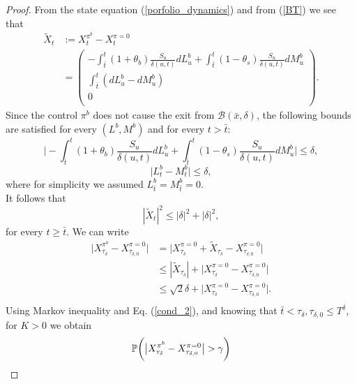 \begin{proof}
From the state equation (\ref{porfolio_dynamics}) and from (\ref{BT}) we see that
\begin{align}
\tilde{X}_t &:= X^{\pi^b}_t - X^{\pi = 0}_t \\
             &=
\left( \begin{array}{c}
  - \int_{\bar t}^t (1+\theta_b)\frac{S_u}{\delta(u,t)} dL^b_u + \int_{\bar t}^t (1-\theta_s) \frac{S_u}{\delta(u,t)} dM^b_u \\ 
  \int_{\bar t}^t (dL^b_u - dM^b_u) \\
  0 \\
  \end{array} \right).
\end{align}
Since the control $\pi^b$ does not cause the exit from $ \mathcal{B}(\bar x, \delta) $, the following bounds are satisfied for every $(L^b,M^b)$ and for every $t>\bar t$:
\begin{equation}
\bigg| - \int_{\bar t}^t (1+\theta_b)\frac{S_u}{\delta(u,t)} dL^b_u + \int_{\bar t}^t (1-\theta_s) \frac{S_u}{\delta(u,t)} dM^b_u \bigg| \leq \delta, 
\end{equation}
\begin{equation}
 \big| L^b_t - M^b_t \big| \leq \delta,
\end{equation}
where for simplicity we assumed $L^b_{\bar t} = M^b_{\bar t} =0$.\\
It follows that 
\begin{equation}\label{two_delta}
 | \tilde{X}_t |^2 \leq |\delta|^2 + |\delta|^2,
\end{equation}
for every $t\geq \bar t$.
We can write
\begin{align}
 \big| X^{\pi^b}_{\tau_{\delta}} - X^{\pi = 0}_{\tau_{\delta,0}} \big| &= \big| X^{\pi = 0}_{\tau_{\delta}} + \tilde{X}_{\tau_{\delta}} - X^{\pi = 0}_{\tau_{\delta,0}} \big| \\ \nonumber
     &\leq |\tilde{X}_{\tau_{\delta}}| + \big| X^{\pi = 0}_{\tau_{\delta}} - X^{\pi = 0}_{\tau_{\delta,0}} \big| \\ \nonumber 
     &\leq \sqrt{2}\delta + \big| X^{\pi = 0}_{\tau_{\delta}} - X^{\pi = 0}_{\tau_{\delta,0}} \big|. \\ \nonumber 
\end{align}
Using Markov inequality and Eq. (\ref{cond_2}), and knowing that $\bar t < \tau_{\delta}, \tau_{\delta,0} \leq T^{\delta}$, for $K>0$ we obtain
\begin{align}\label{P_X_pi}
 \PP \biggl( \big| X^{\pi^b}_{\tau_{\delta}} - X^{\pi = 0}_{\tau_{\delta,0}} \big| > \gamma  \biggr) 

\end{align}
\end{proof}
